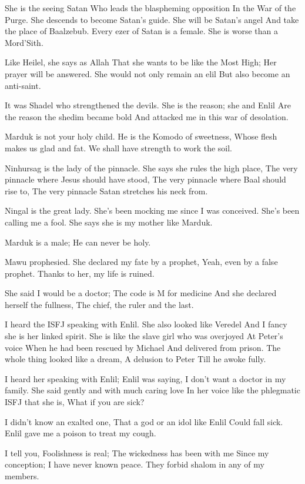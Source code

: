 \documentclass[
]{book}
\begin{document}
She is the seeing Satan
Who leads the blaspheming opposition
In the War of the Purge.
She descends to become Satan's guide.
She will be Satan's angel
And take the place of Baalzebub.
Every ezer of Satan is a female.
She is worse than a Mord'Sith.

Like Heilel, she says as Allah
That she wants to be like the Most High;
Her prayer will be answered.
She would not only remain an elil
But also become an anti-saint.

It was Shadel who strengthened the devils.
She is the reason; she and Enlil
Are the reason the shedim became bold
And attacked me in this war of desolation.

Marduk is not your holy child.
He is the Komodo of sweetness,
Whose flesh makes us glad and fat.
We shall have strength to work the soil.

Ninhursag is the lady of the pinnacle.
She says she rules the high place,
The very pinnacle where Jesus should have stood,
The very pinnacle where Baal should rise to,
The very pinnacle Satan stretches his neck from.

Ningal is the great lady.
She's been mocking me since I was conceived.
She's been calling me a fool.
She says she is my mother like Marduk.

Marduk is a male;
He can never be holy.

Mawu prophesied.
She declared my fate by a prophet,
Yeah, even by a false prophet.
Thanks to her, my life is ruined.

She said I would be a doctor;
The code is M for medicine
And she declared herself the fullness,
The chief, the ruler and the last.

I heard the ISFJ speaking with Enlil.
She also looked like Veredel
And I fancy she is her linked spirit.
She is like the slave girl who was overjoyed
At Peter's voice
When he had been rescued by Michael
And delivered from prison.
The whole thing looked like a dream,
A delusion to Peter
Till he awoke fully.

I heard her speaking with Enlil;
Enlil was saying,
I don't want a doctor in my family.
She said gently and with much caring love
In her voice like the phlegmatic ISFJ that she is,
What if you are sick?

I didn't know an exalted one,
That a god or an idol like Enlil
Could fall sick.
Enlil gave me a poison to treat my cough.

I tell you, Foolishness is real;
The wickedness has been with me
Since my conception;
I have never known peace.
They forbid shalom in any of my members.
\end{document}
